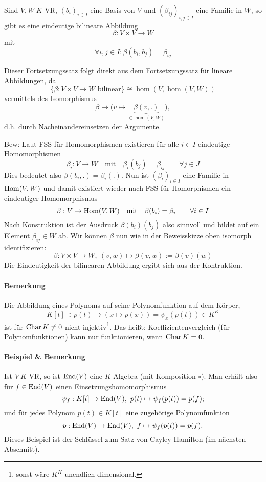 	\begin{Satz}
	Sind $ V,W\ K$-VR, $ (b_i)_{i\in I} $ eine Basis von $ V $ und $ (\beta_{ij})_{i,j\in I} $ eine Familie in $ W $, so gibt es eine eindeutige bilineare Abbildung
		\[ \beta: V\times V\to W \]
	mit
		\[ \forall i,j\in I: \beta(b_i,b_j) = \beta_{ij} \]
	\end{Satz}
	
	Dieser Fortsetzungssatz folgt direkt aus dem Fortsetzungssatz für lineare Abbildungen, da
		\[ \{\beta:V\times V\to W \text{ bilinear}\} \cong \hom(V,\hom(V,W))\]
	vermittels des Isomorphismus
		\[ \beta \mapsto \big(v\mapsto\underset{\in \hom(V,W)}{\underbrace{\beta(v,.)}}\big), \]
	d.h. durch Nacheinandereinsetzen der Argumente.
	
	Bew: Laut FSS für Homomorphismen existieren für alle $i\in I$ eindeutige Homomorphismen
		\[\beta_i:V\to W \quad\text{mit}\quad \beta_i(b_j)=\beta_{ij} \qquad\forall j\in J \]
	Dies bedeutet also $\beta(b_i,.)=\beta_i(.)$. Nun ist $(\beta_i)_{i\in I}$ eine Familie in $\operatorname{Hom}(V,W)$ und damit existiert wieder nach FSS für Homorphismen ein eindeutiger Homomorphismus
		\[\beta:V\to \operatorname{Hom}(V,W) \quad\text{mit}\quad \beta(b_i)=\beta_i \qquad\forall i\in I\]
	Nach Konstruktion ist der Ausdruck $\beta(b_i)(b_j)$ also sinnvoll und bildet auf ein Element $\beta_{ij}\in W$ ab. Wir können $\beta$ nun wie in der Beweisskizze oben isomorph identifizieren:
		\[\beta: V\times V \to W,\ (v,w)\mapsto \beta(v,w):=\beta(v)(w)\]
	Die Eindeutigkeit der bilinearen Abbildung ergibt sich aus der Kontruktion.
	
\paragraph{Bemerkung}
	Die Abbildung eines Polynoms auf seine Polynomfunktion auf dem Körper,
		\[ K[t]\ni p(t)\mapsto (x\mapsto p(x))=\psi_x(p(t))\in K^K \]
	ist für $ \operatorname{Char} K\neq 0 $ nicht injektiv\footnote{sonst wäre $K^K$ unendlich dimensional.}. Das heißt: Koeffizientenvergleich (für Polynomfunktionen) kann nur funktionieren, wenn $ \operatorname{Char} K = 0 $.
\paragraph{Beispiel \& Bemerkung}
	Ist $ V\ K $-VR, so ist $ \operatorname{End}(V) $ eine $ K $-Algebra (mit Komposition $ \circ $). Man erhält also für $ f\in \operatorname{End}(V) $ einen Einsetzungshomomorphismus
		\[ \psi_f: K[t]\to \operatorname{End}(V),\ p(t) \mapsto \psi_f(p(t)) = p(f); \]
	und für jedes Polynom $ p(t)\in K[t] $ eine zugehörige Polynomfunktion
		\[ p: \operatorname{End}(V)\to\operatorname{End}(V),\ f\mapsto \psi_f(p(t))= p(f). \]
	Dieses Beispiel ist der Schlüssel zum Satz von Cayley-Hamilton (im nächsten Abschnitt).
